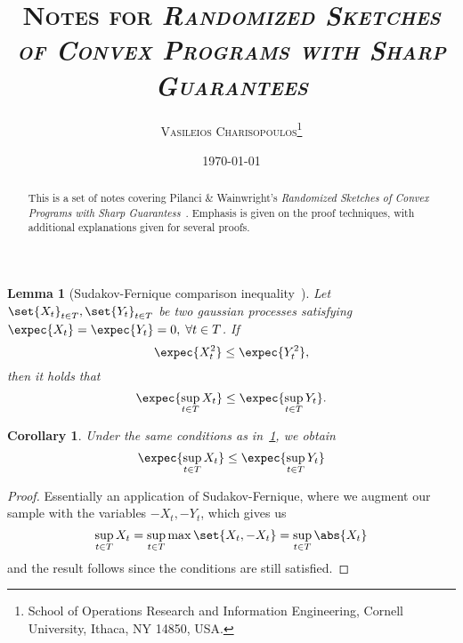 \documentclass[a4paper]{article}
\newtheorem{lemma}{Lemma}
\newtheorem{corollary}{Corollary}
\begin{document}
\title{\textsc{
	Notes for \textit{Randomized Sketches of Convex Programs with Sharp
	Guarantees}}}
\author{
    \textsc{Vasileios Charisopoulos}\thanks{\quad
        School of Operations Research and Information Engineering, Cornell University,
        Ithaca, NY 14850, USA.
   }}
\date{\today}
\maketitle

\begin{abstract}
This is a set of notes covering Pilanci \& Wainwright's \textit{Randomized
Sketches of Convex Programs with Sharp Guarantess}~\cite{PilWain15}. Emphasis
is given on the proof techniques, with additional explanations given for
several proofs.
\end{abstract}

\begin{lemma}[Sudakov-Fernique comparison inequality~\cite{Versh18}]
    \label{lemma:sudakov_fernique}
    Let $\set{X_{t}}_{t \in T}, \set{Y_t}_{t \in T}$ be two gaussian processes
    satisfying $\expec{X_t} = \expec{Y_t} = 0, \; \forall t \in T$. If
    \[
        \expec{X_t^2} \leq \expec{Y_t^2},
    \]
    then it holds that
    \[
        \expec{\sup_{t \in T} X_t} \leq \expec{\sup_{t \in T} Y_t}.
    \]
\end{lemma}
\begin{corollary}
    \label{corl:sudakov_fernique_abs}
    Under the same conditions as in~\cref{lemma:sudakov_fernique}, we obtain
    \[
        \expec{\sup_{t \in T} X_t} \leq \expec{\sup_{t \in T} Y_t}
    \]
\end{corollary}
\begin{proof}
    Essentially an application of Sudakov-Fernique, where we augment our
    sample with the variables $-X_t, -Y_t$, which gives us
    \[
        \sup_{t \in T} X_t = \sup_{t \in T} \max \set{X_t, -X_t}
        = \sup_{t \in T} \abs{X_t}
    \]
    and the result follows since the conditions are still satisfied.
\end{proof}
\end{document}
